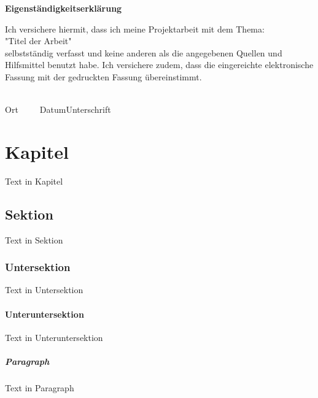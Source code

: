 \documentclass[12pt]{scrreprt}
\begin{document}
\begin{framed}
    \begin{center}
        \Large\bfseries Eigenständigkeitserklärung
    \end{center}
    \medskip
    \noindent
    Ich versichere hiermit, dass ich meine Projektarbeit mit dem Thema:\\
    "Titel der Arbeit"\\
    selbstständig verfasst und keine anderen als die angegebenen Quellen und Hilfsmittel benutzt habe. Ich versichere zudem,
    dass die eingereichte elektronische Fassung mit der gedruckten Fassung übereinstimmt.

    \vspace{3cm}
    \noindent
    \underline{\hspace{4cm}}\hfill\underline{\hspace{6cm}}\\
    Ort~~~~~Datum\hfill Unterschrift\hspace{4cm}
\end{framed}
\pagebreak

\listoffigures
\clearpage
\pagebreak

\tableofcontents
\clearpage
\pagebreak


\chapter{Kapitel}
Text in Kapitel
\section{Sektion}
Text in Sektion
\subsection{Untersektion}
Text in Untersektion
\subsubsection{Unteruntersektion}
Text in Unteruntersektion
\paragraph{Paragraph}
Text in Paragraph

\def\refname{Quellen}
\def\bibname{Quellen}
\end{document}
